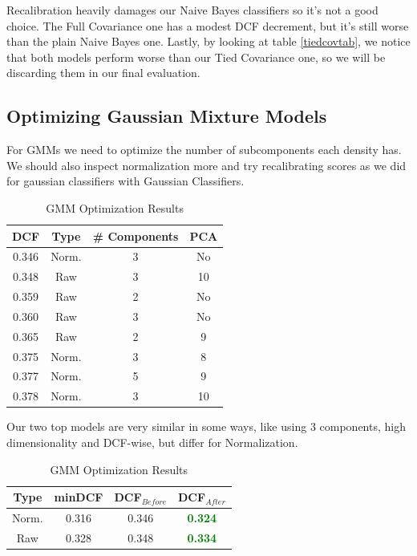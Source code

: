 \documentclass[12pt, twocolumn]{article}
\begin{document}
Recalibration heavily damages our Naive Bayes classifiers so it's not a good choice.
The Full Covariance one has a modest DCF decrement, but it's still worse than the plain Naive Bayes one.
Lastly, by looking at table \ref{tiedcovtab}, we notice that both models perform worse than our Tied Covariance one, so we will be discarding them in our final evaluation.

\subsection{Optimizing Gaussian Mixture Models}

For GMMs we need to optimize the number of subcomponents each density has.
We should also inspect normalization more and try recalibrating scores as we did for gaussian classifiers with Gaussian Classifiers.

\begin{table}[H] 
    \centering
    \begin{tabular}{||c|c|c|c||}
        \hline
        DCF & Type & \# Components & PCA \\
        \hline
        \hline
        0.346 & Norm. & 3 & No \\ 
        0.348 & Raw & 3 &  10 \\
        0.359 & Raw & 2 &  No \\
        0.360 & Raw & 3 &  No \\
        0.365 & Raw & 2 &  9  \\
        0.375 & Norm. & 3 & 8 \\ 
        0.377 & Norm. & 5 & 9 \\ 
        0.378 & Norm. & 3 & 10 \\ 
        \hline
    \end{tabular}
    \caption{GMM Optimization Results}
    \label{tab:gmmoptimization}
\end{table}

Our two top models are very similar in some ways, like using 3 components, high dimensionality and DCF-wise, but differ for Normalization.

\begin{table}[H] 
    \centering
    \begin{tabular}{||c|c|c|c||}
        \hline
        Type & minDCF & DCF$_{Before}$ & DCF$_{After}$ \\
        \hline
        \hline
        Norm. & 0.316 & 0.346 & \textcolor{green}{\bf 0.324} \\
        Raw & 0.328 & 0.348 & \textcolor{green}{\bf 0.334} \\
        \hline
    \end{tabular}
    \caption{GMM Optimization Results}
    \label{tab:gmmcalibration}
\end{table}
\end{document}
